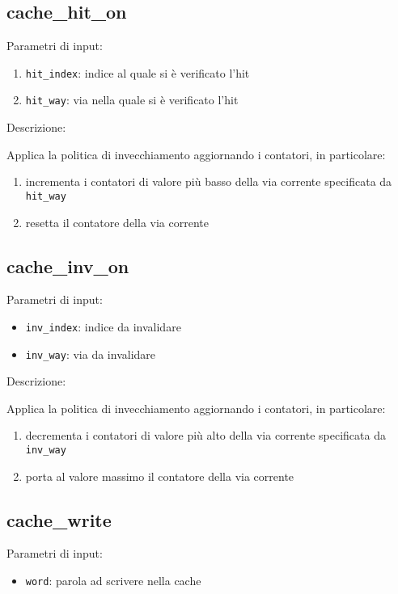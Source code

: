 \subsection{cache\_hit\_on} %

Parametri di input:
\begin{enumerate}
  \item \texttt{hit\_index}: indice al quale si \`e verificato l'hit
  \item \texttt{hit\_way}: via nella quale si \`e verificato l'hit
\end{enumerate}

Descrizione:

Applica la politica di invecchiamento aggiornando i contatori, in particolare:
\begin{enumerate}
  \item incrementa i contatori di valore pi\`u basso della via corrente specificata da \texttt{hit\_way}
  \item resetta il contatore della via corrente
\end{enumerate}	

\subsection{cache\_inv\_on} %

Parametri di input:
\begin{itemize}
  \item \texttt{inv\_index}: indice da invalidare
  \item \texttt{inv\_way}: via da invalidare
\end{itemize}

Descrizione:

Applica la politica di invecchiamento aggiornando i contatori, in particolare:
\begin{enumerate}
  \item decrementa i contatori di valore pi\`u alto della via corrente specificata da \texttt{inv\_way}
  \item porta al valore massimo il contatore della via corrente
\end{enumerate}	
	

\subsection{cache\_write} %

Parametri di input:
\begin{itemize}
  \item \texttt{word}: parola ad scrivere nella cache

\end{itemize}

